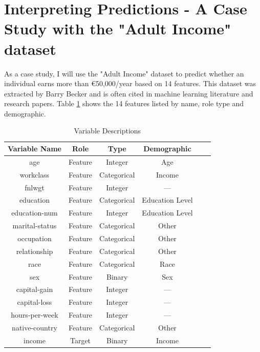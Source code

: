 \documentclass[10pt,journal,compsoc]{IEEEtran}
\begin{document}
\section{Interpreting Predictions - A Case Study with the "Adult Income" dataset}
As a case study, I will use the "Adult Income" dataset\cite{misc_adult_2} to predict whether an individual earns more than €50,000/year based on 14 features. This dataset was extracted by Barry Becker \cite{misc_adult_2} and is often cited in machine learning literature and research papers.
Table \ref{tab:variable-descriptions} shows the 14 features listed by name, role type and demographic.

\begin{table}[h]
    \centering
    \caption{Variable Descriptions}
    \begin{tabularx}{\columnwidth}{cccccc}
        \toprule
        \textbf{Variable Name} & \textbf{Role} & \textbf{Type} & \textbf{Demographic} \\
        \midrule
        age                    & Feature       & Integer       & Age                  \\
        workclass              & Feature       & Categorical   & Income               \\
        fnlwgt                 & Feature       & Integer       & ---                  \\
        education              & Feature       & Categorical   & Education Level      \\
        education-num          & Feature       & Integer       & Education Level      \\
        marital-status         & Feature       & Categorical   & Other                \\
        occupation             & Feature       & Categorical   & Other                \\
        relationship           & Feature       & Categorical   & Other                \\
        race                   & Feature       & Categorical   & Race                 \\
        sex                    & Feature       & Binary        & Sex                  \\
        capital-gain           & Feature       & Integer       & ---                  \\
        capital-loss           & Feature       & Integer       & ---                  \\
        hours-per-week         & Feature       & Integer       & ---                  \\
        native-country         & Feature       & Categorical   & Other                \\
        income                 & Target        & Binary        & Income               \\
        \bottomrule
    \end{tabularx}
    \label{tab:variable-descriptions}
\end{table}
\end{document}

